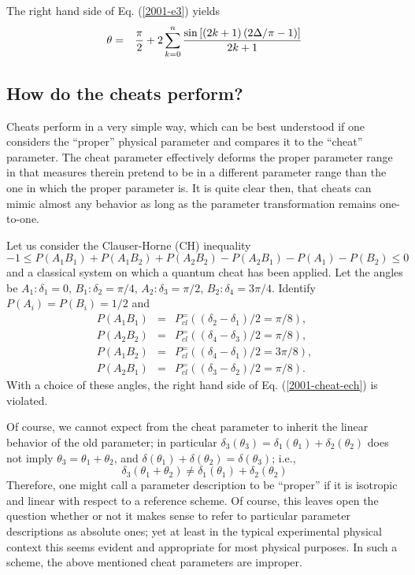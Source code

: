 The right hand side of Eq. (\ref{2001-e3})
yields
\begin{eqnarray}
\theta &=&
{\pi \over 2}
+
{2}
\sum_{k=0}^n
{
\sin \left[(2k+1)\left({2\Delta/ \pi}-1\right) \right]
\over 2k+1}
\end{eqnarray}

\subsection{How do the cheats perform?}

Cheats perform in a very simple way, which can be best understood if one considers
the ``proper'' physical parameter  and compares it to the ``cheat'' parameter.
The cheat parameter effectively deforms the proper parameter range in that
measures therein pretend to be in a different parameter range than the one in which
the proper parameter is. It is quite clear then, that cheats can mimic almost any
behavior as long as the parameter transformation remains  one-to-one.

Let us consider the Clauser-Horne (CH) inequality
\begin{equation}
-1\leq P(A_{1}B_{1})+P(A_{1}B_{2})+P(A_{2}B_{2})-P(A_{2}B_{1})-P(A_{1})-P(B_{2}) \leq 0
\label{2001-cheat-ech}
\end{equation}
and a classical system on which a quantum cheat has been applied.
Let the angles be
$A_{1}:\delta_1 = 0$,
$B_{1}:\delta_2 = \pi /4$,
$A_{2}:\delta_3 = \pi /2$,
$B_{2}:\delta_4 = 3\pi /4$.
Identify
$P(A_{i})=P(B_{i})= 1/2$
and
\begin{eqnarray}
P(A_1B_1)&=& P^{=}_{cl}((\delta_2 -\delta_1)/2 = \pi /8),
\nonumber \\
P(A_2B_2)&=& P^{=}_{cl}((\delta_4 -\delta_3)/2 = \pi /8),
\nonumber \\
P(A_1B_2)&=& P^{=}_{cl}((\delta_4 -\delta_1)/2 =3\pi /8),
\nonumber \\
P(A_2B_1)&=& P^{=}_{cl}((\delta_3 -\delta_2)/2 = \pi /8).
\nonumber
\end{eqnarray}
With a choice of these angles, the right hand side of Eq. (\ref{2001-cheat-ech}) is violated.

Of course, we cannot expect from the cheat parameter to inherit the linear behavior of the
old parameter; in particular
$
\delta_3(\theta_3)
=
\delta_1(\theta_1)+
\delta_2(\theta_2)$ does not imply $\theta_3=\theta_1+\theta_2$,
and
$\delta(\theta_1)+\delta(\theta_2)=\delta(\theta_3)$; i.e.,
\begin{equation}
\delta_3(\theta_1+\theta_2)
\neq
\delta_1(\theta_1)+
\delta_2(\theta_2)
\end{equation}
Therefore, one might call a parameter description to be ``proper''
if it is isotropic and linear with respect to a reference scheme.
Of course, this leaves open the question whether or not it makes sense to
refer to particular parameter descriptions as absolute ones;
yet at least in the typical experimental physical context this seems evident
and appropriate for most physical purposes.
In such a scheme, the above mentioned cheat parameters are improper.




